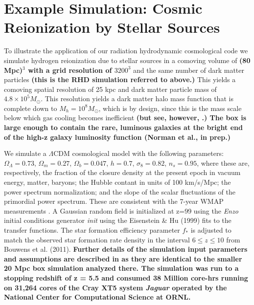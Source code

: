 
\section{Example Simulation: Cosmic Reionization by Stellar Sources}
\label{sec:example_simulation}

To illustrate the application of our radiation hydrodynamic cosmological code we
simulate hydrogen reionization due to stellar sources in a comoving volume of {\bf (80 Mpc)$^3$ with a grid
resolution of $3200^3$} and the same number of dark matter particles {\bf (this is the RHD simulation referred to above.)} This yields a comoving spatial resolution of 25 kpc and
dark matter particle mass of $4.8 \times 10^5 M_{\odot}$. This resolution yields a dark matter halo mass function that
is complete down to $M_h = 10^8 M_{\odot}$, which is by design, since this is the mass scale below 
which gas cooling becomes inefficient {\bf (but see, however, \cite{Wise2014}.) The box is large enough to contain the rare, luminous galaxies at the bright end of the high-z galaxy luminosity function (Norman et al., in prep.)}

We simulate a $\Lambda$CDM cosmological model with the following parameters: 
$\Omega_{\Lambda} = 0.73$, $\Omega_m = 0.27$, $\Omega_b = 0.047$, 
$h = 0.7$, $\sigma_8 = 0.82$, $n_s = 0.95$, where these are, respectively, the fraction of the 
closure density at the present epoch in vacuum energy, matter, baryons;
the Hubble contant in units of 100 km/s/Mpc; the power spectrum normalization; 
and the slope of the scalar fluctuations of the primordial power spectrum. These are
consistent with the 7-year WMAP measurements \cite{WMAP7}. A Gaussian random
field is initialized at z=99 using the {\em Enzo} initial conditions generator {\em init} 
using the Eisenstein \& Hu (1999) fits to the transfer functions. The star formation efficiency
parameter $f_*$ is adjusted to match the observed star formation rate density in the interval $6 \leq z \leq 10$ from
Bouwens et al. (2011).  {\bf Further details of the simulation input parameters and assumptions are described in \cite{So2014} as they are identical to the smaller 20 Mpc box simulation analyzed there.
The simulation was run to a stopping redshift of z = 5.5 and consumed 38 Million core-hrs running on 31,264 cores of the Cray XT5 system {\em Jaguar} operated by the 
National Center for Computational Science at ORNL. }

